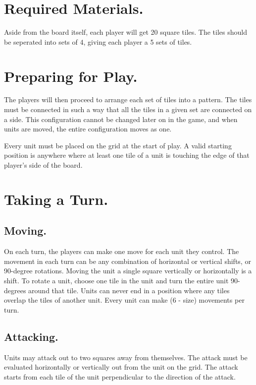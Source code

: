 \section{Required Materials.}

Aside from the board itself, each player will get 20 square tiles.
The tiles should be seperated into sets of 4, giving each player a 5 sets of tiles.

\section{Preparing for Play.}

The players will then proceed to arrange each set of tiles into a pattern.
The tiles must be connected in such a way that all the tiles in a given set are connected on a side.
This configuration cannot be changed later on in the game, and when units are moved, the entire configuration moves as one.

Every unit must be placed on the grid at the start of play.
A valid starting position is anywhere where at least one tile of a unit is touching the edge of that player's side of the board.

\section{Taking a Turn.}

\subsection{Moving.}

On each turn, the players can make one move for each unit they control.
The movement in each turn can be any combination of horizontal or vertical shifts, or 90-degree rotations.
Moving the unit a single square vertically or horizontally is a shift.
To rotate a unit, choose one tile in the unit and turn the entire unit 90-degrees around that tile.
Units can never end in a position where any tiles overlap the tiles of another unit.
Every unit can make (6 - size) movements per turn.

\subsection{Attacking.}

Units may attack out to two squares away from themselves.
The attack must be evaluated horizontally or vertically out from the unit on the grid.
The attack starts from each tile of the unit perpendicular to the direction of the attack.

